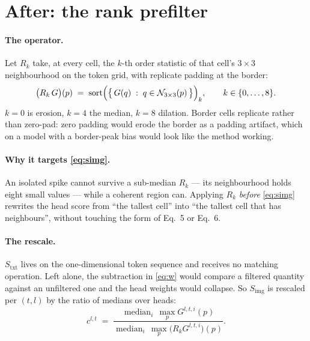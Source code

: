 \documentclass[11pt]{article}
\begin{document}
\section{After: the rank prefilter}

\paragraph{The operator.} Let $R_k$ take, at every cell, the $k$-th order
statistic of that cell's $3\times3$ neighbourhood on the token grid, with
replicate padding at the border:
\begin{equation}
\bigl(R_k\,G\bigr)(p) \;=\; \operatorname{sort}\Bigl(\bigl\{\,G(q) \;:\; q \in \mathcal{N}_{3\times3}(p)\,\bigr\}\Bigr)_{k},
\qquad k \in \{0,\dots,8\}.
\label{eq:rank}
\end{equation}
$k = 0$ is erosion, $k = 4$ the median, $k = 8$ dilation. Border cells replicate
rather than zero-pad: zero padding would erode the border as a padding artifact,
which on a model with a border-peak bias would look like the method working.

\paragraph{Why it targets \eqref{eq:simg}.} An isolated spike cannot survive a
sub-median $R_k$ --- its neighbourhood holds eight small values --- while a
coherent region can. Applying $R_k$ \emph{before} \eqref{eq:simg} rewrites the
head score from ``the tallest cell'' into ``the tallest cell that has
neighbours'', without touching the form of Eq.~5 or Eq.~6.

\paragraph{The rescale.} $S_{\text{txt}}$ lives on the one-dimensional token
sequence and receives no matching operation. Left alone, the subtraction in
\eqref{eq:w} would compare a filtered quantity against an unfiltered one and the
head weights would collapse. So $S_{\text{img}}$ is rescaled per $(t,l)$ by the
ratio of medians over heads:
\begin{equation}
c^{l,t} \;=\; \frac{\operatorname{median}_{i}\,\max_p G^{l,t,i}(p)}
                   {\operatorname{median}_{i}\,\max_p \bigl(R_k G^{l,t,i}\bigr)(p)} .
\label{eq:rescale}
\end{equation}
\end{document}
